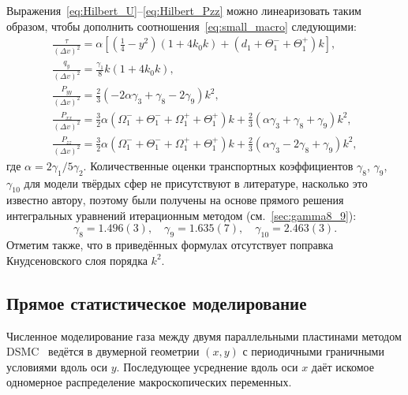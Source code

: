 \documentclass[a4paper,12pt]{article}
\begin{document}
Выражения~\eqref{eq:Hilbert_U}--\eqref{eq:Hilbert_Pzz} можно линеаризовать таким образом,
чтобы дополнить соотношения~\eqref{eq:small_macro} следующими:
\begin{equation}\label{eq:Hilbert_macro}
    \begin{gathered}
    \frac{\tau}{(\Delta{v})^2} = \alpha
        \left[ \left(\frac14-y^2\right)(1+4k_0k) + (d_1+\Theta_1^-+\Theta_1^+)k \right], \\
    \frac{q_y}{(\Delta{v})^2} = \frac{\gamma_1}{8}k(1+4k_0k), \\
    \frac{P_{yy}}{(\Delta{v})^2} = \frac23\left(-2\alpha\gamma_3 + \gamma_8 - 2\gamma_9\right)k^2, \\
    \frac{P_{xx}}{(\Delta{v})^2} = \frac32\alpha\left(\Omega_1^-+\Theta_1^-+\Omega_1^++\Theta_1^+\right)k +
        \frac23\left(\alpha\gamma_3 + \gamma_8 + \gamma_9\right)k^2, \\
    \frac{P_{zz}}{(\Delta{v})^2} = \frac32\alpha\left(\Omega_1^-+\Theta_1^-+\Omega_1^++\Theta_1^+\right)k +
        \frac23\left(\alpha\gamma_3 - 2\gamma_8 + \gamma_9\right)k^2,
    \end{gathered}
\end{equation}
где \(\alpha = 2\gamma_1/5\gamma_2\).
Количественные оценки транспортных коэффициентов \(\gamma_8\), \(\gamma_9\), \(\gamma_{10}\)
для модели твёрдых сфер не присутствуют в литературе, насколько это известно автору,
поэтому были получены на основе прямого решения интегральных уравнений
итерационным методом (см.~\cref{sec:gamma8_9}):
\begin{equation}\label{eq:gamma_numerical}
    \gamma_8 = 1.496(3), \quad \gamma_9 = 1.635(7), \quad \gamma_{10} = 2.463(3).
\end{equation}
Отметим также, что в приведённых формулах отсутствует поправка Кнудсеновского слоя порядка \(k^2\).

\subsection{Прямое статистическое моделирование}

Численное моделирование газа между двумя параллельными пластинами методом DSMC~\cite{Bird1994}
ведётся в двумерной геометрии \((x,y)\) с периодичными граничными условиями вдоль оси \(y\).
Последующее усреднение вдоль оси \(x\) даёт искомое одномерное распределение макроскопических переменных.
\end{document}
